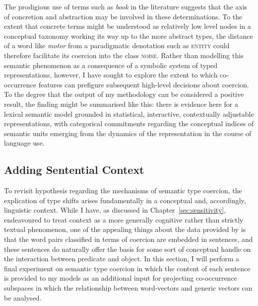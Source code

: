 The prodigious use of terms such as \emph{book} in the literature suggests that the axis of concretion and abstraction may be involved in these determinations.  To the extent that concrete terms might be understood as relatively low level nodes in a conceptual taxonomy working its way up to the more abstract types, the distance of a word like \emph{motor} from a paradigmatic denotation such as \textsc{entity} could therefore facilitate its coercion into the class \textsc{noise}.  Rather than modelling this semantic phenomenon as a consequence of a symbolic system of typed representations, however, I have sought to explore the extent to which co-occurrence features can prefigure subsequent high-level decisions about coercion.  To the degree that the output of my methodology can be considered a positive result, the finding might be summarised like this: there is evidence here for a lexical semantic model grounded in statistical, interactive, contextually adjustable representations, with categorical commitments regarding the conceptual indices of semantic units emerging from the dynamics of the representation in the course of language use.

\subsection{Adding Sentential Context}
To revisit  hypothesis regarding the mechanisms of semantic type coercion, the explication of type shifts arises fundamentally in a conceptual and, accordingly, linguistic context.  While I have, as discussed in Chapter~\ref{sec:sensitivity}, endeavoured to treat context as a more generally cognitive rather than strictly textual phenomenon, one of the appealing things about the data provided by \cite{PustejovskyEA2010} is that the word pairs classified in terms of coercion are embedded in sentences, and these sentences do naturally offer the basis for some sort of conceptual handle on the interaction between predicate and object.  In this section, I will perform a final experiment on semantic type coercion in which the content of each sentence is provided to my models as an additional input for projecting co-occurrence subspaces in which the relationship between word-vectors and generic vectors can be analysed.

